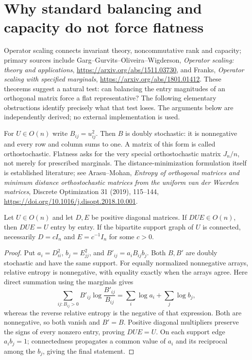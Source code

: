 \section{Why standard balancing and capacity do not force flatness}
\label{sec:capacity-obstruction}

Operator scaling connects invariant theory, noncommutative rank and
capacity; primary sources include Garg--Gurvits--Oliveira--Wigderson,
\emph{Operator scaling: theory and applications},
\url{https://arxiv.org/abs/1511.03730}, and Franks,
\emph{Operator scaling with specified marginals},
\url{https://arxiv.org/abs/1801.01412}. These theorems suggest a natural
test: can balancing the entry magnitudes of an orthogonal matrix force
a flat representative? The following elementary obstructions identify
precisely what that test loses. The arguments below are independently
derived; no external implementation is used.

For $U\in O(n)$ write $B_{ij}=u_{ij}^2$. Then $B$ is doubly stochastic:
it is nonnegative and every row and column sums to one. A matrix of
this form is called orthostochastic. Flatness asks for the very special
orthostochastic matrix $J_n/n$, not merely for prescribed marginals.
The distance-minimization formulation itself is established literature;
see Arasu--Mohan, \emph{Entropy of orthogonal matrices and minimum
distance orthostochastic matrices from the uniform van der Waerden
matrices}, Discrete Optimization 31 (2019), 115--144,
\url{https://doi.org/10.1016/j.disopt.2018.10.001}.

\begin{proposition}
Let $U\in O(n)$ and let $D,E$ be positive diagonal matrices.
If $DUE\in O(n)$, then $DUE=U$ entry by entry.
If the bipartite support graph of $U$ is connected, necessarily
$D=cI_n$ and $E=c^{-1}I_n$ for some $c>0$.
\end{proposition}
\begin{proof}
Put $a_i=D_{ii}^2$, $b_j=E_{jj}^2$, and
$B'_{ij}=a_iB_{ij}b_j$. Both $B,B'$ are doubly stochastic and have
the same support. For equally normalized nonnegative arrays, relative
entropy is nonnegative, with equality exactly when the arrays agree.
Here direct summation using the marginals gives
\[
 \sum_{ij:B_{ij}>0}B'_{ij}\log\frac{B'_{ij}}{B_{ij}}
 =\sum_i\log a_i+\sum_j\log b_j,
\]
whereas the reverse relative entropy is the negative of that expression.
Both are nonnegative, so both vanish and $B'=B$.
Positive diagonal multipliers preserve the signs of every nonzero
entry, proving $DUE=U$. On each support edge $a_ib_j=1$;
connectedness propagates a common value of $a_i$ and its reciprocal
among the $b_j$, giving the final statement.
\end{proof}

